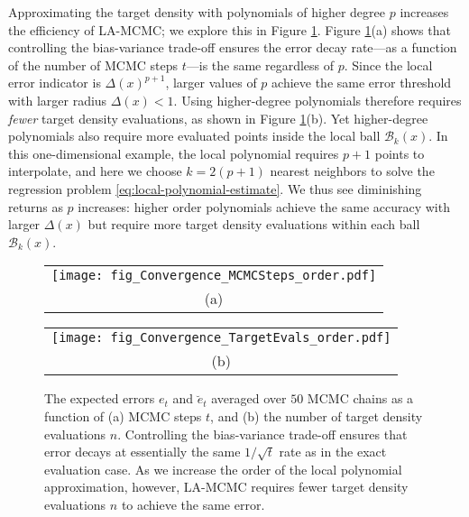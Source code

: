 Approximating the target density with polynomials of higher degree $p$ increases the efficiency of LA-MCMC; we explore this in Figure \ref{fig:1d-example-order}. Figure \ref{fig:1d-example-order}(a) shows that controlling the bias-variance trade-off ensures the error decay rate---as a function of the number of MCMC steps $t$---is the same regardless of $p$. Since the local error indicator is $\Delta(x)^{p+1}$, larger values of $p$ achieve the same error threshold with larger radius $\Delta(x) < 1$. Using higher-degree polynomials therefore requires \emph{fewer} target density evaluations, as shown in Figure \ref{fig:1d-example-order}(b). Yet higher-degree polynomials also require more evaluated points inside the local ball $\mathcal{B}_k(x)$. In this one-dimensional example, the local polynomial requires $p+1$ points to interpolate, and here we choose $k=2(p+1)$ nearest neighbors to solve the regression problem \eqref{eq:local-polynomial-estimate}. We thus see diminishing returns as $p$ increases: higher order polynomials achieve the same accuracy with larger $\Delta(x)$ but require more target density evaluations within each ball $\mathcal{B}_k(x)$. 

\begin{figure}
  \centering
  \begin{tabular}{@{}c@{}}
    \texttt{[image: fig\_Convergence\_MCMCSteps\_order.pdf]} \\[\abovecaptionskip]
    \small (a)
  \end{tabular}

  \vspace{\floatsep}

  \begin{tabular}{@{}c@{}}
    \texttt{[image: fig\_Convergence\_TargetEvals\_order.pdf]} \\[\abovecaptionskip]
    \small (b)
  \end{tabular}

  \caption{The expected errors $e_t$ and $\breve{e}_t$ averaged over $50$ MCMC chains as a function of (a) MCMC steps $t$, and (b) the number of target density evaluations $n$. Controlling the bias-variance trade-off ensures that error decays at essentially the same $1/\sqrt{t}$ rate as in the exact evaluation case. As we increase the order of the local polynomial approximation, however, LA-MCMC requires fewer target density evaluations $n$ to achieve the same error.}
  \label{fig:1d-example-order}
\end{figure}

